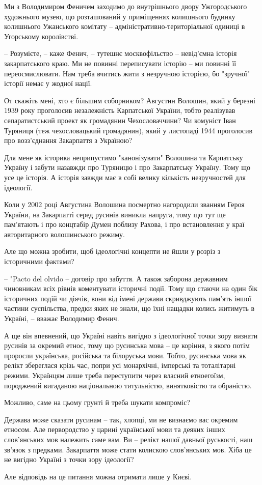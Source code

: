 Ми з Володимиром Феничем заходимо до внутрішнього двору Ужгородського
художнього музею, що розташований у приміщеннях колишнього будинку колишнього
Ужанського комітату – адміністративно-територіальної одиниці в Угорському
королівстві.

– Розумієте, – каже Фенич, – тутешнє москвофільство – невід’ємна історія
закарпатського краю. Ми не повинні переписувати історію – ми повинні її
переосмислювати. Нам треба вчитись жити з незручною історією, бо "зручної"
історії немає у жодної нації.

От скажіть мені, хто є більшим соборником? Августин Волошин, який у березні
1939 року проголосив незалежність Карпатської України, тобто реалізував
сепаратистський проект як громадянин Чехословаччини? Чи комуніст Іван Туряниця
(теж чехословацький громадянин), який у листопаді 1944 проголосив про
возз’єднання Закарпаття з Україною?

Для мене як історика неприпустимо "канонізувати" Волошина та Карпатську Україну
і забути назавжди про Туряницю і про Закарпатську Україну. Тому що усе це
історія. А історія завжди має в собі велику кількість незручностей для
ідеології.

Коли у 2002 році Августина Волошина посмертно нагородили званням Героя України,
на Закарпатті серед русинів виникла напруга, тому що тут ще пам’ятають і про
концтабір Думен поблизу Рахова, і про встановлення у краї авторитарного
волошинського режиму.

Але що можна зробити, щоб ідеологічні концепти не йшли у розріз з історичними
фактами?

– "Pacto del olvido – договір про забуття. А також заборона державним
чиновникам всіх рівнів коментувати історичні події. Тому що стаючи на один бік
історичних подій чи діячів, вони від імені держави скривджують пам'ять іншої
частини суспільства, предки яких не знали, що їхні нащадки колись житимуть в
Україні, – вважає Володимир Фенич.

А ще він впевнений, що Україні навіть вигідно з ідеологічної точки зору визнати
русинів за окремий етнос, тому що русинська мова – це коріння, з якого потім
проросли українська, російська та білоруська мови. Тобто, русинська мова як
релікт збереглася крізь час, попри усі монархічні, імперські та тоталітарні
режими. Українцям лише треба переступити через власний етноегоїзм, породжений
вигаданою національною титульністю, винятковістю та обраністю.

Можливо, саме на цьому грунті й треба шукати компроміс?

Держава може сказати русинам – так, хлопці, ми не визнаємо вас окремим етносом.
Але первородство у царині української мови та деяких інших слов’янських мов
належить саме вам. Ви – релікт нашої давньої руськості, наш зв'язок з предками.
Закарпаття може стати колискою слов’янських мов. Хіба це не вигідно Україні з
точки зору ідеології?

Але відповідь на це питання можна отримати лише у Києві.
